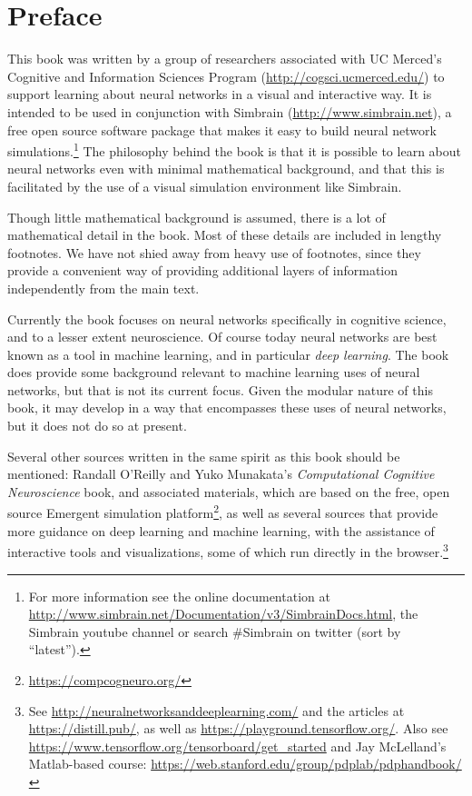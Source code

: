 \chapter*{Preface}\label{ch_preface}

This book was written by a group of researchers associated with UC Merced's Cognitive and Information Sciences Program (\url{http://cogsci.ucmerced.edu/}) to support learning about neural networks in a visual and interactive way. It is intended to be used in conjunction with Simbrain (\url{http://www.simbrain.net}), a free open source software package that makes it easy to build neural network simulations.\footnote{For more information see the online documentation at \url{http://www.simbrain.net/Documentation/v3/SimbrainDocs.html}, the Simbrain youtube channel or search \#Simbrain on twitter (sort by ``latest'').} The philosophy behind the book is that it is possible to learn about neural networks even with minimal mathematical background, and that this is facilitated by the use of a visual simulation environment like Simbrain.

Though little mathematical background is assumed, there is a lot of mathematical detail in the book. Most of these details are included in lengthy footnotes. We have not shied away from heavy use of footnotes, since they provide a convenient way of providing additional layers of information independently from the main text. 

Currently the book focuses on neural networks specifically in cognitive science, and to a lesser extent neuroscience. Of course today neural networks are best known as a tool in machine learning, and in particular \emph{deep learning}. The book does provide some background relevant to machine learning uses of neural networks, but that is not its current focus. Given the modular nature of this book, it may develop in a way that encompasses these uses of neural networks, but it does not do so at present.

Several other sources written in the same spirit as this book should be mentioned: Randall O'Reilly and Yuko Munakata's \emph{Computational Cognitive Neuroscience} book, and associated materials, which are based on the free, open source Emergent simulation platform\footnote{\url{https://compcogneuro.org/}}, as well as several sources that provide more guidance on deep learning and machine learning, with the assistance of interactive tools and visualizations, some of which run directly in the browser.\footnote{See \url{http://neuralnetworksanddeeplearning.com/} and the articles at \url{https://distill.pub/}, as well as \url{https://playground.tensorflow.org/}. Also see  \url{https://www.tensorflow.org/tensorboard/get_started} and Jay McLelland's Matlab-based course: \url{https://web.stanford.edu/group/pdplab/pdphandbook/}}

